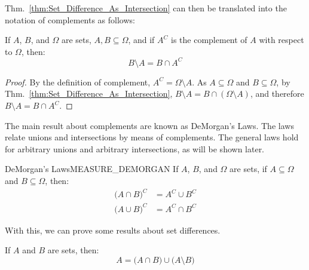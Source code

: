\documentclass[crop=false,class=book,oneside]{standalone}
\begin{document}
            Thm.~\ref{thm:Set_Difference_As_Intersection}
            can then be translated into the notation of
            complements as follows:
            \begin{theorem}
                If $A$, $B$, and $\Omega$ are sets,
                $A,B\subseteq\Omega$, and if $A^{C}$ is the
                complement of $A$ with respect to $\Omega$, then:
                \begin{equation}
                    B\setminus{A}=B\cap{A}^{C}
                \end{equation}
            \end{theorem}
            \begin{proof}
                By the definition of complement,
                $A^{C}=\Omega\setminus{A}$.
                As $A\subseteq\Omega$ and $B\subseteq\Omega$, by
                Thm.~\ref{thm:Set_Difference_As_Intersection},
                $B\setminus{A}=B\cap(\Omega\setminus{A})$,
                and therefore $B\setminus{A}=B\cap{A}^{C}$.
            \end{proof}
            The main result about complements are known as
            DeMorgan's Laws. The laws relate unions and
            intersections by means of complements. The general
            laws hold for arbitrary unions and arbitrary
            intersections, as will be shown later.
            \begin{ftheorem}{DeMorgan's Laws}{MEASURE_DEMORGAN}
                If $A$, $B$, and $\Omega$ are sets, if
                $A\subseteq\Omega$ and $B\subseteq\Omega$, then:
                \begin{subequations}
                    \begin{align}
                        \big(A\cap{B}\big)^{C}
                        &=A^{C}\cup{B}^{C}\\
                        \big(A\cup{B}\big)^{C}
                        &=A^{C}\cap{B}^{C}
                    \end{align}
                \end{subequations}
            \end{ftheorem}
            With this, we can prove some results about
            set differences.
            \begin{theorem}
                If $A$ and $B$ are sets, then:
                \begin{equation}
                    A=\big(A\cap{B}\big)
                        \cup\big(A\setminus{B}\big)
                \end{equation}
            \end{theorem}
\end{document}
